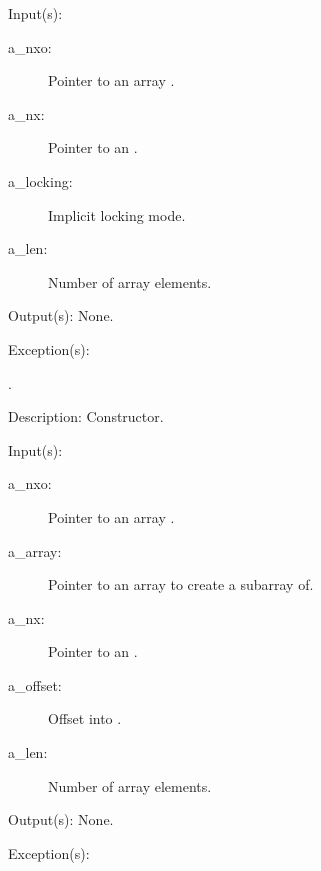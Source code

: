 \begin{capi}
\label{nxo_array_new}
	\begin{capilist}
	\item[Input(s): ]
		\begin{description}\item[]
		\item[a\_nxo: ]
			Pointer to an array .
		\item[a\_nx: ]
			Pointer to an .
		\item[a\_locking: ]
			Implicit locking mode.
		\item[a\_len: ]
			Number of array elements.
		\end{description}
	\item[Output(s): ] None.
	\item[Exception(s): ]
		\begin{description}\item[]
		\item[.]
		\end{description}
	\item[Description: ]
		Constructor.
	\end{capilist}
\label{nxo_array_subarray_new}
	\begin{capilist}
	\item[Input(s): ]
		\begin{description}\item[]
		\item[a\_nxo: ]
			Pointer to an array \classname{nxo}.
		\item[a\_array: ]
			Pointer to an array  to create a subarray
			of.
		\item[a\_nx: ]
			Pointer to an \classname{nx}.
		\item[a\_offset: ]
			Offset into \cvar{a\_array}.
		\item[a\_len: ]
			Number of array elements.
		\end{description}
	\item[Output(s): ] None.
	\item[Exception(s): ]
		\begin{description}\item[]

\end{description}
\end{capilist}
\end{capi}
